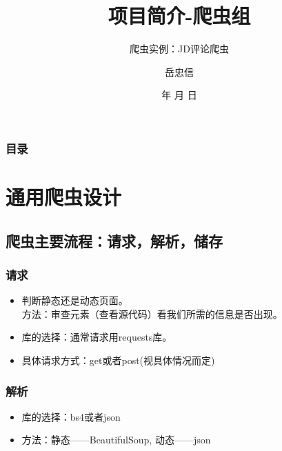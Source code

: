 \documentclass{beamer}
\begin{document}
\title{项目简介-爬虫组}
\subtitle{爬虫实例：JD评论爬虫}

\author{岳忠信}


\renewcommand{\today}{\number\year 年 \number\month 月 \number\day 日}
\date{\today}

\subject{Presentations}

\begin{frame}
\titlepage
\end{frame}

\begin{frame}
\frametitle{目录}
\begin{multicols}{2}
\end{multicols}
\end{frame}

\section{通用爬虫设计}
\subsection{爬虫主要流程：请求，解析，储存}

\begin{frame}
\frametitle{请求}
\begin{itemize}
  \item 判断静态还是动态页面。\\ 方法：审查元素（查看源代码）看我们所需的信息是否出现。
  \item 库的选择：通常请求用requests库。
  \item 具体请求方式：get或者post(视具体情况而定)
\end{itemize}
\end{frame}

\begin{frame}
\frametitle{解析}
\begin{itemize}
  \item 库的选择：bs4或者json
  \item 方法：静态——BeautifulSoup, 动态——json
\end{itemize}
\end{frame}
\end{document}
